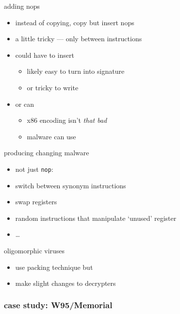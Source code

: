
\begin{frame}{adding nops}
    \begin{itemize}
    \item instead of copying, copy but insert nops
    \item a little tricky --- only between instructions
    \item could have  to insert
        \begin{itemize}
        \item likely easy to turn into signature
        \item or tricky to write
        \end{itemize}
    \item or can 
        \begin{itemize}
        \item x86 encoding isn't \textit{that bad}
        \item malware can use 
        \end{itemize}
    \end{itemize}
\end{frame}

\begin{frame}{producing changing malware}
    \begin{itemize}
    \item not just {\tt nop}:
    \vspace{.5cm}
    \item switch between synonym instructions
    \item swap registers
    \item random instructions that manipulate `unused' register
    \item \ldots
    \end{itemize}
\end{frame}

\begin{frame}{oligomorphic viruses}
    \begin{itemize}
    \item use packing technique but
    \item make slight changes to decrypters
    \end{itemize}
\end{frame}

\subsubsection{case study: W95/Memorial}

